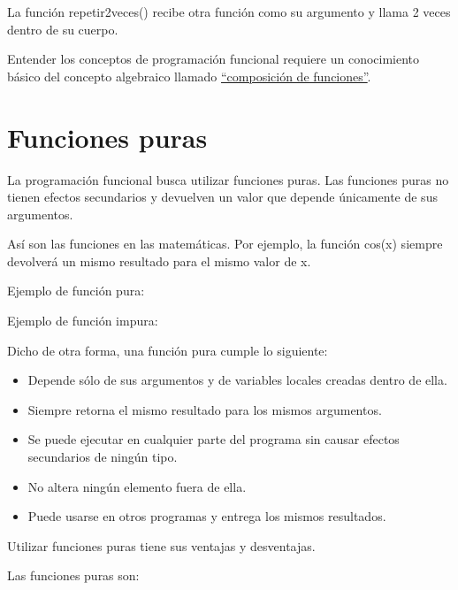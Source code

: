 \documentclass{report}
\newcommand{\doble}[1]{``#1''}
\newcommand{\link}[2]{\href{#1}{\underline{#2}}}
\begin{document}

La función repetir2veces() recibe otra función como su argumento y llama 2 veces dentro de su cuerpo.\smallskip

Entender los conceptos de programación funcional requiere un conocimiento básico del concepto algebraico llamado \link{https://www.mathsisfun.com/sets/functions-composition.html}{\doble{composición de funciones}}.

\section{Funciones puras}

La programación funcional busca utilizar funciones puras. Las funciones puras no tienen efectos secundarios y devuelven un valor que depende únicamente de sus argumentos.\smallskip

Así son las funciones en las matemáticas. Por ejemplo, la función cos(x) siempre devolverá un mismo resultado para el mismo valor de x.

Ejemplo de función pura:


Ejemplo de función impura:


Dicho de otra forma, una función pura cumple lo siguiente:

\begin{itemize}
  \item Depende sólo de sus argumentos y de variables locales creadas dentro de ella.
  
  \item Siempre retorna el mismo resultado para los mismos argumentos.

  \item Se puede ejecutar en cualquier parte del programa sin causar efectos secundarios de ningún tipo.
  
  \item No altera ningún elemento fuera de ella.
  
  \item Puede usarse en otros programas y entrega los mismos resultados.
  
\end{itemize}

Utilizar funciones puras tiene sus ventajas y desventajas.

Las funciones puras son:
\end{document}
